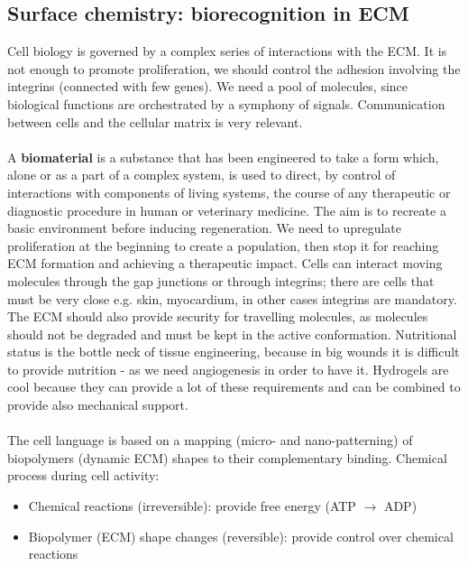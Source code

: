 \subsection{Surface chemistry: biorecognition in ECM}
Cell biology is governed by a complex series of interactions with the ECM. It is not enough to promote proliferation, we should control the adhesion involving the integrins (connected with few genes). We need a pool of molecules, since biological functions are orchestrated by a symphony of signals. Communication between cells and the cellular matrix is very relevant.
\\
\\
\noindent
A \textbf{biomaterial} is a substance that has been engineered to take a form which, alone or as a part of a complex system, is used to direct, by control of interactions with components of living systems, the course of any therapeutic or diagnostic procedure in human or veterinary medicine.
The aim is to recreate a basic environment before inducing regeneration. We need to upregulate proliferation at the beginning to create a population, then stop it for reaching ECM formation and achieving a therapeutic impact. 
\noindent
Cells can interact moving molecules through the gap junctions or through integrins; there are cells that must be very close e.g. skin, myocardium, in other cases integrins are mandatory. The ECM should also provide security for travelling molecules,  as molecules should not be degraded and must be kept in the active conformation. 
Nutritional status is the bottle neck of tissue engineering, because in big wounds it is difficult to provide nutrition - as we need angiogenesis in order to have it. Hydrogels are cool because they can provide a lot of these requirements and can be combined to provide also mechanical support.
\\
\\
\noindent
The cell language is based on a mapping (micro- and nano-patterning) of biopolymers (dynamic ECM) shapes to their complementary binding. Chemical process during cell activity:
\begin{itemize}
\item Chemical reactions (irreversible): provide free energy (ATP $\rightarrow$ ADP)
\item Biopolymer (ECM) shape changes (reversible): provide control over chemical reactions
\end{itemize}

